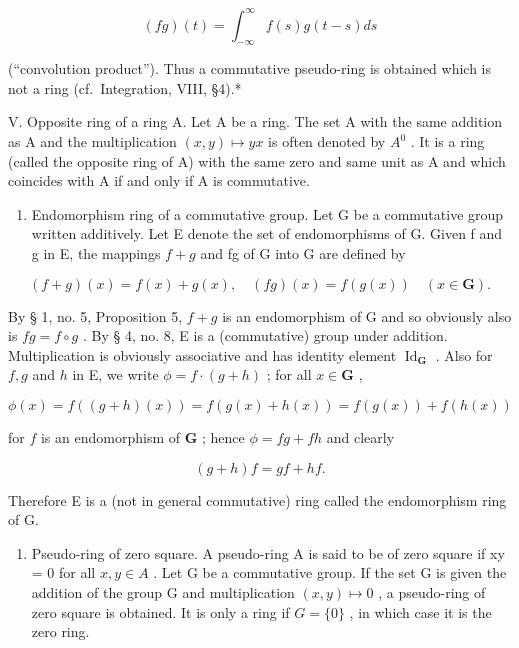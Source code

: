 \[
(f g) (t) = \int_ {- \infty} ^ {\infty} f (s) g (t - s) d s
\]

(``convolution product''). Thus a commutative pseudo-ring is obtained which is not a ring (cf.~Integration, VIII, §4).*

V. Opposite ring of a ring A. Let A be a ring. The set A with the same addition as A and the multiplication \((x,y)\mapsto yx\) is often denoted by \(A^{0}\) . It is a ring (called the opposite ring of A) with the same zero and same unit as A and which coincides with A if and only if A is commutative.

\begin{enumerate}
\def\labelenumi{\Roman{enumi}.}
\setcounter{enumi}{5}
\tightlist
\item
  Endomorphism ring of a commutative group. Let G be a commutative group written additively. Let E denote the set of endomorphisms of G. Given f and g in E, the mappings \(f + g\) and fg of G into G are defined by
\end{enumerate}

\[
(f + g) (x) = f (x) + g (x), \quad (f g) (x) = f (g (x)) \quad (x \in \mathbf {G}).
\]

By § 1, no. 5, Proposition 5, \(f + g\) is an endomorphism of G and so obviously also is \(fg = f \circ g\) . By § 4, no. 8, E is a (commutative) group under addition. Multiplication is obviously associative and has identity element \(\operatorname{Id}_{\mathbf{G}}\) . Also for \(f, g\) and \(h\) in E, we write \(\phi = f \cdot (g + h)\) ; for all \(x \in \mathbf{G}\) ,

\[
\phi (x) = f ((g + h) (x)) = f (g (x) + h (x)) = f (g (x)) + f (h (x))
\]

for \(f\) is an endomorphism of \(\mathbf{G}\) ; hence \(\phi = fg + fh\) and clearly

\[
(g + h) f = g f + h f.
\]

Therefore E is a (not in general commutative) ring called the endomorphism ring of G.

\begin{enumerate}
\def\labelenumi{\Roman{enumi}.}
\setcounter{enumi}{6}
\tightlist
\item
  Pseudo-ring of zero square. A pseudo-ring A is said to be of zero square if xy = 0 for all \(x, y \in A\) . Let G be a commutative group. If the set G is given the addition of the group G and multiplication \((x, y) \mapsto 0\) , a pseudo-ring of zero square is obtained. It is only a ring if \(G = \{0\}\) , in which case it is the zero ring.
\end{enumerate}

